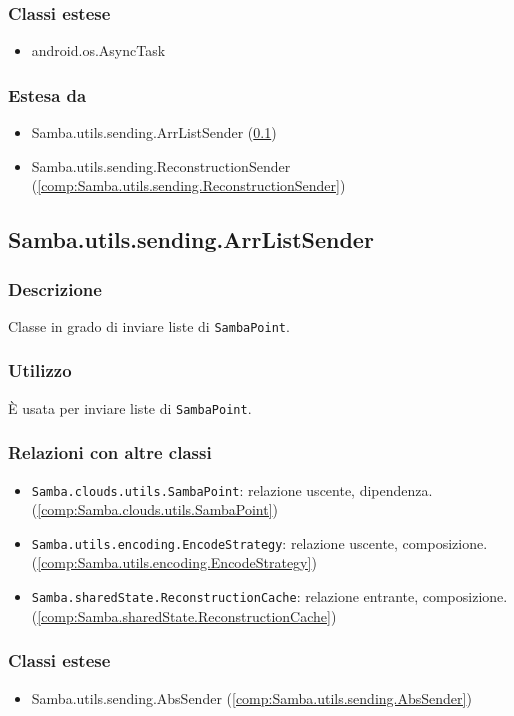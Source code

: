 \subsubsection{Classi estese}
\begin{itemize}
	\item android.os.AsyncTask
\end{itemize}
\subsubsection{Estesa da}
\begin{itemize}
	\item Samba.utils.sending.ArrListSender (\ref{comp:Samba.utils.sending.ArrListSender})
	\item Samba.utils.sending.ReconstructionSender (\ref{comp:Samba.utils.sending.ReconstructionSender})
\end{itemize}

\subsection{Samba.utils.sending.ArrListSender}\label{comp:Samba.utils.sending.ArrListSender}
\subsubsection{Descrizione}
Classe in grado di inviare liste di \texttt{SambaPoint}.
\subsubsection{Utilizzo}
È usata per inviare liste di \texttt{SambaPoint}.
\subsubsection{Relazioni con altre classi}
\begin{itemize}
	\item \texttt{Samba.clouds.utils.SambaPoint}: relazione uscente, dipendenza. (\ref{comp:Samba.clouds.utils.SambaPoint})
	\item \texttt{Samba.utils.encoding.EncodeStrategy}: relazione uscente, composizione. (\ref{comp:Samba.utils.encoding.EncodeStrategy})
	\item \texttt{Samba.sharedState.ReconstructionCache}: relazione entrante, composizione. (\ref{comp:Samba.sharedState.ReconstructionCache})
\end{itemize}
\subsubsection{Classi estese}
\begin{itemize}
	\item Samba.utils.sending.AbsSender (\ref{comp:Samba.utils.sending.AbsSender})
\end{itemize}

